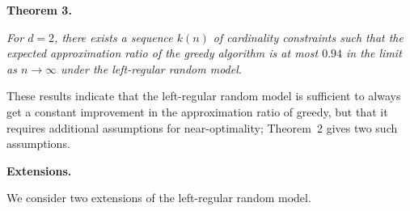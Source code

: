 \documentclass[10pt,a4paper]{article}
\begin{document}


\par\medskip\noindent\textbf{\textbf{Theorem 3}\textbf{.}}\par



\emph{For $d=2$, there exists a sequence $k(n)$ of cardinality constraints such that the expected approximation ratio of the greedy algorithm is at most $0.94$ in the limit as $n\rightarrow\infty$ under the left-regular random model.}\par






These results indicate that the left-regular random model is sufficient to always get a constant improvement in the approximation ratio of greedy, but that it requires additional assumptions for near-optimality; Theorem 2 gives two such assumptions.\par





\par\medskip\noindent\textbf{Extensions.}\par




We consider two extensions of the left-regular random model.\par
\end{document}
